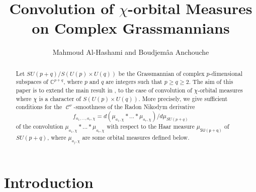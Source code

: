 \documentclass[11pt,a4paper]{amsart}
\DeclareMathOperator{\C}{\mathcal{C}}
\theoremstyle{definition}
\numberwithin{equation}{section}
\begin{document}
\title[Smoothness of the Radon-Nikodym derivative]{Convolution of $\chi$-orbital Measures on Complex Grassmannians}
\author{Mahmoud Al-Hashami and Boudjem\^aa Anchouche}
\address{University of Technology and Applied Sciences, Nizwa, \ Oman.\newline
Department of Mathematics, Kuwait University}
\date{%
}



\begin{abstract}
Let  {\scriptsize $SU(p+q)/S\left(U(p)\times U(q) \right)$} be the Grassmannian of complex $p$-dimensional subspaces of $\mathbb{C}^{p+q}$, where $p$ and $q$  are integers such that $p\geq q \geq 2$. 
The aim of this paper is to extend the main result in \cite{anchouche2}, \cite{Alhashami} to the case of convolution of $\chi$-orbital measures  where $\chi$ is a character of $S\left(U(p)\times U(q) \right)$. More precisely, we give sufficient conditions for the $\C^{\nu}$-smoothness of the Radon Nikodym derivative $$f_{ a_{1},...,a_{r}, \chi}=d\left(\mu_{a_1, \chi}\ast...\ast\mu_{a_r, \chi}\right)  /d\mu_{{SU(p+q)}}$$ of the convolution
$\mu_{a_1, \chi}\ast...\ast\mu_{a_r, \chi}$  with respect to the Haar measure $\mu_{\mathsf{SU(p+q)}}$ of $SU(p+q)$, where $\mu_{a_j, \chi}$ are some orbital measures defined below.
\end{abstract}
\maketitle
\tableofcontents



\section{Introduction} \label{intro}
\end{document}
